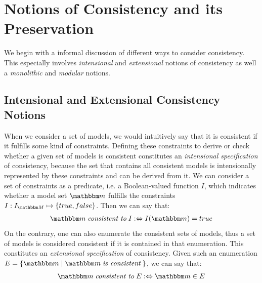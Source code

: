 \section{Notions of Consistency and its Preservation}
\label{chap:correctness:notions_consistency}


We begin with a informal discussion of different ways to consider consistency. This especially involves \emph{intensional} and \emph{extensional} notions of consistency as well a \emph{monolithic} and \emph{modular} notions.


\subsection{Intensional and Extensional Consistency Notions}
\label{chap:correctness:notions_consistency:intensional_extensional}

When we consider a set of models, we would intuitively say that it is consistent if it fulfills some kind of constraints.
Defining these constraints to derive or check whether a given set of models is consistent constitutes an \emph{intensional specification} of consistency, because the set that contains all consistent models is intensionally represented by these constraints and can be derived from it.
We can consider a set of constraints as a predicate, i.e. a Boolean-valued function $I$, which indicates whether a model set $\modelset{m}$ fulfills the constraints $I: \metamodelsetinstanceset{M} \mapsto \setted{true, false}$. Then we can say that:
\begin{align*}
    \modelset{m} \consistenttomath I \equivalentperdefinition I(\modelset{m}) = true
\end{align*}
On the contrary, one can also enumerate the consistent sets of models, thus a set of models is considered consistent if it is contained in that enumeration.
This constitutes an \emph{extensional specification} of consistency.
Given such an enumeration $E = \setted{\modelset{m} \mid \modelset{m} \mathtext{is consistent}}$, we can say that:
\begin{align*}
    \modelset{m} \consistenttomath E \equivalentperdefinition \modelset{m} \in E
\end{align*}

